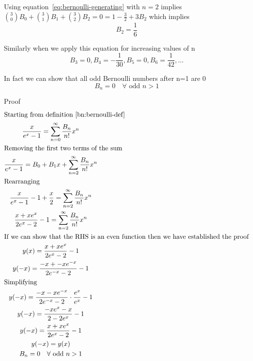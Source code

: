 \documentclass[a4paper]{article}
\begin{document}
Using equation~\ref{eq:bernoulli-generating} with $n=2$ implies $ \binom{3}{0} B_0 + \binom{3}{1} B_1 + \binom{3}{2} B_2 = 0 = 1 - \frac{3}{2} + 3 B_2 $ which implies
\begin{equation}
    B_2 = \frac{1}{6}\label{bn:eq:equation2}
\end{equation}

Similarly when we apply this equation for increasing values of n
\begin{equation}
    B_3 = 0, B_4 = -\frac{1}{30}, B_5 = 0, B_6 = \frac{1}{42}, \dots \label{bn:eq:equation3}
\end{equation}


\begin{theorem}
    In fact we can show that all odd Bernoulli numbers after n=1 are 0
    \begin{equation}
        \label{bn:eq:odd-bernoulli} B_n = 0  \quad \forall \text{ odd }n > 1
    \end{equation}

    Proof
    \begin{gather*}
        \intertext{Starting from definition~\ref{bn:bernoulli-def}}
        \frac{x}{e^x -1} = \sum_{n=0}^{\infty} \frac{B_n}{n!} x^n
        \\
        \intertext{Removing the first two terms of the sum}
        \frac{x}{e^x -1} = B_0 + B_1 x + \sum_{n=2}^{\infty} \frac{B_n}{n!} x^n\\
        \intertext{Rearranging}
        \frac{x}{e^x -1}  - 1 + \frac{x}{2}= \sum_{n=2}^{\infty} \frac{B_n}{n!} x^n
        \\
        \frac{x + xe^x}{2e^x -2}  - 1 = \sum_{n=2}^{\infty} \frac{B_n}{n!} x^n
        \\
        \intertext{If we can show that the RHS is an even function then we have established the proof}
        y(x) = \frac{x + xe^x}{2e^x -2}  - 1
        \\
        y(-x) = \frac{-x + -xe^{-x}}{2e^{-x} -2}  - 1
        \\
        \intertext{Simplifying}
        y(-x) = \frac{-x -xe^{-x}}{2e^{-x} -2} \cdot \frac{e^x}{e^x}  - 1
        \\
        y(-x) = \frac{-xe^x -x}{2 -2e^x}  - 1
        \\
        y(-x) = \frac{x+xe^x}{2e^x - 2}  - 1
        \\
        y(-x) = y(x)
        \\
        B_n = 0  \quad \forall \text{ odd }n > 1
    \end{gather*}
\end{theorem}
\end{document}
